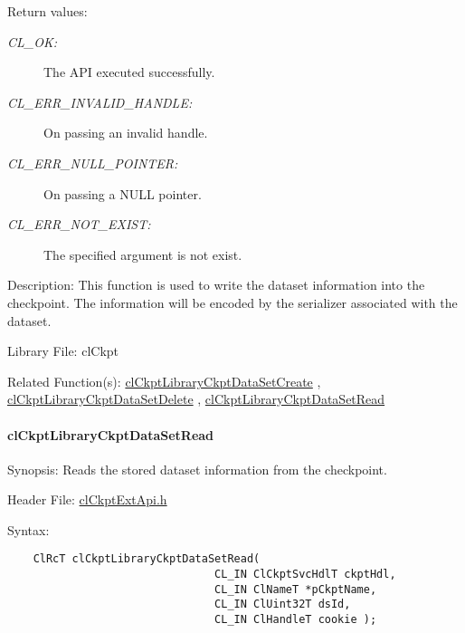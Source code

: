 \begin{Desc}
\item[Return values:]
\begin{description}
\item[{\em CL\_\-OK:}]The API executed successfully. \item[{\em CL\_\-ERR\_\-INVALID\_\-HANDLE:}]On passing an invalid handle. \item[{\em CL\_\-ERR\_\-NULL\_\-POINTER:}]On passing a NULL pointer. \item[{\em CL\_\-ERR\_\-NOT\_\-EXIST:}]The specified argument is not exist.\end{description}
\end{Desc}
\begin{Desc}
\item[Description:]This function is used to write the dataset information into the checkpoint. The information will be encoded by the serializer associated with the dataset.\end{Desc}
\begin{Desc}
\item[Library File:]cl\-Ckpt\end{Desc}
\begin{Desc}
\item[Related Function(s):]\hyperlink{group__group10}{cl\-Ckpt\-Library\-Ckpt\-Data\-Set\-Create} , \hyperlink{group__group10}{cl\-Ckpt\-Library\-Ckpt\-Data\-Set\-Delete} , \hyperlink{group__group10}{cl\-Ckpt\-Library\-Ckpt\-Data\-Set\-Read} \end{Desc}
\hypertarget{pageckpt208}{}\paragraph{cl\-Ckpt\-Library\-Ckpt\-Data\-Set\-Read}\label{pageckpt208}
\begin{Desc}
\item[Synopsis:]Reads the stored dataset information from the checkpoint.\end{Desc}
\begin{Desc}
\item[Header File:]\hyperlink{cl_ckpt_ext_api_8h}{cl\-Ckpt\-Ext\-Api.h}\end{Desc}
\begin{Desc}
\item[Syntax:]

\footnotesize\begin{verbatim}    ClRcT clCkptLibraryCkptDataSetRead(
                                CL_IN ClCkptSvcHdlT ckptHdl,
                                CL_IN ClNameT *pCkptName,
                                CL_IN ClUint32T dsId,
                                CL_IN ClHandleT cookie );
\end{verbatim}
\normalsize
\end{Desc}
